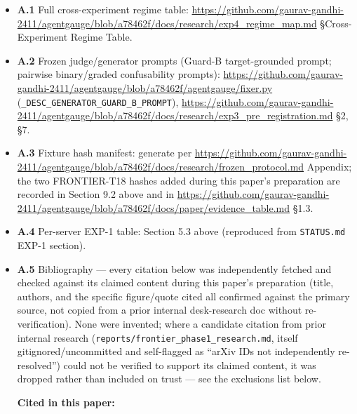 \begin{itemize}
\item
  \textbf{A.1} Full cross-experiment regime table:
  \url{https://github.com/gaurav-gandhi-2411/agentgauge/blob/a78462f/docs/research/exp4_regime_map.md}
  §Cross-Experiment Regime Table.
\item
  \textbf{A.2} Frozen judge/generator prompts (Guard-B target-grounded
  prompt; pairwise binary/graded confusability prompts):
  \url{https://github.com/gaurav-gandhi-2411/agentgauge/blob/a78462f/agentgauge/fixer.py}
  (\texttt{\_DESC\_GENERATOR\_GUARD\_B\_PROMPT}),
  \url{https://github.com/gaurav-gandhi-2411/agentgauge/blob/a78462f/docs/research/exp3_pre_registration.md}
  §2, §7.
\item
  \textbf{A.3} Fixture hash manifest: generate per
  \url{https://github.com/gaurav-gandhi-2411/agentgauge/blob/a78462f/docs/research/frozen_protocol.md}
  Appendix; the two FRONTIER-T18 hashes added during this paper's preparation are recorded in
  Section 9.2 above and in
  \url{https://github.com/gaurav-gandhi-2411/agentgauge/blob/a78462f/docs/paper/evidence_table.md}
  §1.3.
\item
  \textbf{A.4} Per-server EXP-1 table: Section 5.3 above (reproduced
  from \texttt{STATUS.md} EXP-1 section).
\item
  \textbf{A.5} Bibliography --- every citation below was independently
  fetched and checked against its claimed content during this paper's preparation (title,
  authors, and the specific figure/quote cited all confirmed against the
  primary source, not copied from a prior internal desk-research doc
  without re-verification). None were invented; where a candidate
  citation from prior internal research
  (\texttt{reports/frontier\_phase1\_research.md}, itself
  gitignored/uncommitted and self-flagged as ``arXiv IDs not
  independently re-resolved'') could not be verified to support its
  claimed content, it was dropped rather than included on trust --- see
  the exclusions list below.

  \textbf{Cited in this paper:}


\end{itemize}

